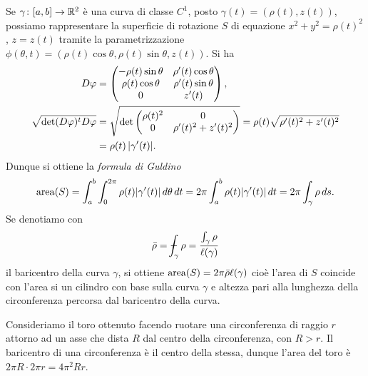 Se $\gamma\colon [a,b]\to {\mathbb R}^2$ è una curva di classe $C^1$, 
posto $\gamma(t) = (\rho(t), z(t))$, 
possiamo rappresentare la superficie di rotazione 
$S$ di equazione $x^2+y^2 = \rho(t)^2$, $z=z(t)$ tramite la parametrizzazione
$\phi(\theta, t) = (\rho(t)\cos\theta, \rho(t)\sin\theta, z(t))$.
Si ha 
\begin{align*}
  D\varphi &= \begin{pmatrix}
  -\rho(t)\sin \theta & \rho'(t)\cos\theta \\
  \rho(t)\cos\theta & \rho'(t)\sin\theta \\
  0 & z'(t) 
  \end{pmatrix},\\
  \sqrt{\det (D\varphi)^t D\varphi} 
    &= \sqrt{\det \begin{pmatrix}
    \rho(t)^2 & 0 \\
    0 & \rho'(t)^2 + z'(t)^2
    \end{pmatrix}}
    = \rho(t) \sqrt{\rho'(t)^2 + z'(t)^2}\\
    &= \rho(t) \,{\left|\gamma'(t)\right|}.
\end{align*}
Dunque si ottiene la \emph{formula di Guldino}
%
%
\begin{equation}\label{eq:formula_guldino}
 \operatorname{area}(S) = \int_a^b \int_0^{2\pi} \rho(t) {\left|\gamma'(t)\right|}\, d\theta\, dt 
  = 2\pi \int_a^b \rho(t) {\left|\gamma'(t)\right|}\, dt
  = 2\pi \int_\gamma \rho\, ds.
\end{equation}
Se denotiamo con 
\[
 \bar \rho = \dashint_\gamma \rho = \frac{\int_\gamma \rho}{\ell(\gamma)}
\]
il baricentro della curva $\gamma$, si ottiene 
$\operatorname{area}(S) = 2\pi \bar \rho \ell(\gamma)$ cioè
l'area di $S$ coincide con l'area si un cilindro 
con base sulla curva $\gamma$ e altezza pari alla 
lunghezza della circonferenza percorsa dal baricentro 
della curva.

\begin{example}
Consideriamo il toro ottenuto facendo ruotare una circonferenza di 
raggio $r$ attorno ad un asse che dista $R$ dal centro della circonferenza, con $R>r$.
Il baricentro di una circonferenza è il centro della stessa, 
dunque l'area del toro è $2\pi R \cdot 2\pi r = 4\pi^2 R r$.
\end{example}
